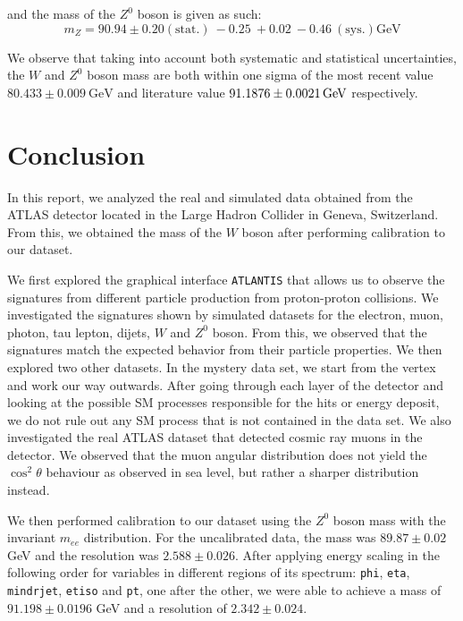\documentclass[a4paper]{report}
\numberwithin{equation}{section}
\begin{document}
and the mass of the $Z^0$ boson is given as such: 
\begin{equation}
    m_Z = 90.94 \pm 0.20 (\mathrm{stat.}) \: -0.25 \: + 0.02 \: -0.46 \: (\mathrm{sys.}) \si{\giga\electronvolt}
\end{equation}

We observe that taking into account both systematic and statistical uncertainties, the $W$ and $Z^0$ boson mass are both 
within one sigma of the most recent value $80.433 \pm 0.009 \ \text{GeV}$ and literature value 
$\SI{91.1876 \pm 0.0021}{\giga\electronvolt}$ respectively. 

\chapter{Conclusion}

In this report, we analyzed the real and simulated data obtained from the ATLAS detector located in the Large Hadron 
Collider in Geneva, Switzerland. From this, we obtained the mass of the $W$ boson after performing calibration 
to our dataset. \par 

We first explored the graphical interface \texttt{ATLANTIS} that allows us to observe the signatures from different particle 
production from proton-proton collisions. We investigated the signatures shown by simulated datasets for the 
electron, muon, photon, tau lepton, dijets, $W$ and $Z^0$ boson. From this, we observed that the signatures match the expected 
behavior from their particle properties. We then explored two other datasets. In the mystery data set, we start from the vertex and work our way outwards. After going through each layer of the detector and looking at the possible SM processes responsible for the hits or energy deposit, we do not rule out any SM process that is not contained in the data set. 
We also investigated the real ATLAS dataset that detected cosmic ray muons in the detector. We observed that the muon angular
distribution does not yield the $\cos^2 \theta$ behaviour as observed in sea level, but rather a sharper distribution instead. \par

We then performed calibration to our dataset using the $Z^0$ boson mass with the invariant $m_{ee}$ distribution. For the uncalibrated data, the mass was $89.87 \pm 0.02$ GeV and the resolution was $2.588 \pm 0.026$. After applying energy scaling in the following order for variables in different regions of its spectrum: \texttt{phi}, \texttt{eta}, \texttt{mindrjet}, \texttt{etiso} and \texttt{pt}, one after the other, we were able to achieve a mass of $91.198 \pm 0.0196$ GeV and a resolution of $2.342 \pm 0.024$. \par 
\end{document}
